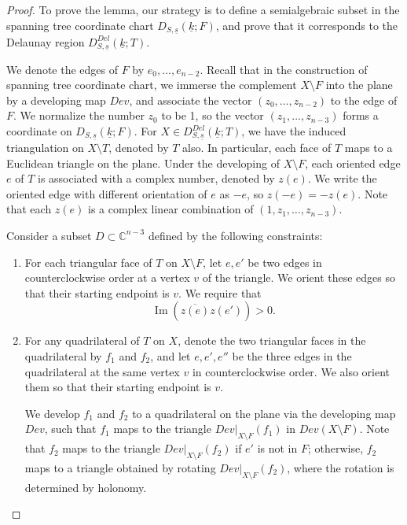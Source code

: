 \documentclass{compositio}
\numberwithin{equation}{section}
\numberwithin{figure}{section}
\theoremstyle{definition}
\theoremstyle{plain}
\begin{document}
{\begin{proof}
    To prove the lemma, our strategy is to define a semialgebraic subset in the spanning tree coordinate chart $D_{S,\underline{s}}(\underline{k};F)$, and prove that it corresponds to the Delaunay region $D_{S,\underline{s}}^{Del}(\underline{k};T)$.

    We denote the edges of $F$ by $e_0,\ldots,e_{n-2}$. Recall that in the construction of spanning tree coordinate chart, we immerse the complement $X\setminus F$ into the plane by a developing map $Dev$, and associate the vector $(z_0,\ldots,z_{n-2})$ to the edge of $F$. We normalize the number $z_0$ to be 1, so the vector $(z_1,\ldots,z_{n-3})$ forms a coordinate on $D_{S,\underline{s}}(\underline{k};F)$. For $X\in D_{S,\underline{s}}^{Del}(\underline{k};T)$, we have the induced triangulation on $X\setminus T$, denoted by $T$ also. In particular, each face of $T$ maps to a Euclidean triangle on the plane. Under the developing of $X\setminus F$, each oriented edge $e$ of $T$ is associated with a complex number, denoted by $z(e)$. We write the oriented edge with different orientation of $e$ as $-e$, so $z(-e) = -z(e)$.  Note that each $z(e)$ is a complex linear combination of $(1, z_1,\ldots,z_{n-3})$.

    Consider a subset $D \subset \mathbb{C}^{n-3}$ defined by the following constraints:
    \begin{enumerate} 
        \item For each triangular face of $T$ on $X\setminus F$, let $e, e'$ be two edges in counterclockwise order at a vertex $v$ of the triangle. We orient these edges so that their starting endpoint is $v$.
        We require that 
        $$
        \operatorname{Im}\left(\overline{z(e)}z(e')\right) > 0.
        $$
        \item For any quadrilateral of $T$ on $X$, denote the two triangular faces in the quadrilateral by $f_1$ and $f_2$, and let $e, e', e''$ be the three edges in the quadrilateral at the same vertex $v$ in counterclockwise order. We also orient them so that their starting endpoint is $v$.
    
        We develop $f_1$ and $f_2$ to a quadrilateral on the plane via the developing map $Dev$, such that $f_1$ maps to the triangle $Dev|_{X \setminus F}(f_1)$ in $Dev(X \setminus F)$. Note that $f_2$ maps to the triangle $Dev|_{X \setminus F}(f_2)$ if $e'$ is not in $F$; otherwise, $f_2$ maps to a triangle obtained by rotating $Dev|_{X \setminus F}(f_2)$, where the rotation is determined by holonomy. 
    

\end{enumerate}
\end{proof}}
\end{document}
